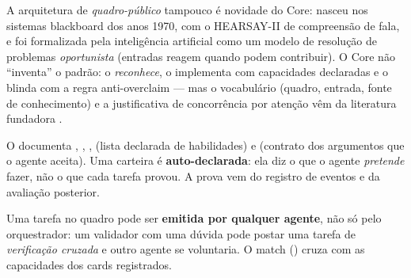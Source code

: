 \par\smallskip
A arquitetura de \emph{quadro-público} tampouco é novidade do Core: nasceu nos
sistemas blackboard dos anos 1970, com o HEARSAY-II de compreensão de fala, e
foi formalizada pela inteligência artificial como um modelo de resolução de
problemas \emph{oportunista} (entradas reagem quando podem contribuir). O Core
não ``inventa'' o padrão: o \emph{reconhece}, o implementa com capacidades
declaradas e o blinda com a regra anti-overclaim — mas o vocabulário
(quadro, entrada, fonte de conhecimento) e a justificativa de concorrência por
atenção vêm da literatura fundadora .

\begin{descricao}
O  documenta , ,
,  (lista declarada de habilidades) e
 (contrato dos argumentos que o agente aceita). Uma carteira é
\textbf{auto-declarada}: ela diz o que o agente \emph{pretende} fazer, não o que
cada tarefa provou. A prova vem do registro de eventos e da avaliação posterior.
\end{descricao}


\begin{funcao}
Uma tarefa no quadro pode ser \textbf{emitida por qualquer agente}, não só pelo
orquestrador: um validador com uma dúvida pode postar uma tarefa de
\emph{verificação cruzada} e outro agente se voluntaria. O match
() cruza  com as capacidades dos
cards registrados.
\end{funcao}


